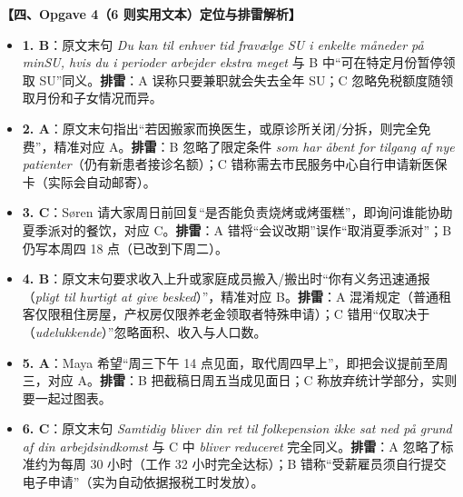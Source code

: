 \begin{answerbox}
\textbf{\color{NCDNavy}【四、Opgave 4（6 则实用文本）定位与排雷解析】}
\begin{itemize}
  \item \textbf{1. B}：原文末句 \textit{Du kan til enhver tid fravælge SU i enkelte måneder på minSU, hvis du i perioder arbejder ekstra meget} 与 B 中“可在特定月份暂停领取 SU”同义。\textbf{排雷}：A 误称只要兼职就会失去全年 SU；C 忽略免税额度随领取月份和子女情况而异。
  \item \textbf{2. A}：原文末句指出“若因搬家而换医生，或原诊所关闭/分拆，则完全免费”，精准对应 A。\textbf{排雷}：B 忽略了限定条件 \textit{som har åbent for tilgang af nye patienter}（仍有新患者接诊名额）；C 错称需去市民服务中心自行申请新医保卡（实际会自动邮寄）。
  \item \textbf{3. C}：Søren 请大家周日前回复“是否能负责烧烤或烤蛋糕”，即询问谁能协助夏季派对的餐饮，对应 C。\textbf{排雷}：A 错将“会议改期”误作“取消夏季派对”；B 仍写本周四 18 点（已改到下周二）。
  \item \textbf{4. B}：原文末句要求收入上升或家庭成员搬入/搬出时“你有义务迅速通报（\textit{pligt til hurtigt at give besked}）”，精准对应 B。\textbf{排雷}：A 混淆规定（普通租客仅限租住房屋，产权房仅限养老金领取者特殊申请）；C 错用“仅取决于（\textit{udelukkende}）”忽略面积、收入与人口数。
  \item \textbf{5. A}：Maya 希望“周三下午 14 点见面，取代周四早上”，即把会议提前至周三，对应 A。\textbf{排雷}：B 把截稿日周五当成见面日；C 称放弃统计学部分，实则要一起过图表。
  \item \textbf{6. C}：原文末句 \textit{Samtidig bliver din ret til folkepension ikke sat ned på grund af din arbejdsindkomst} 与 C 中 \textit{bliver reduceret} 完全同义。\textbf{排雷}：A 忽略了标准约为每周 30 小时（工作 32 小时完全达标）；B 错称“受薪雇员须自行提交电子申请”（实为自动依据报税工时发放）。
\end{itemize}
\end{answerbox}

